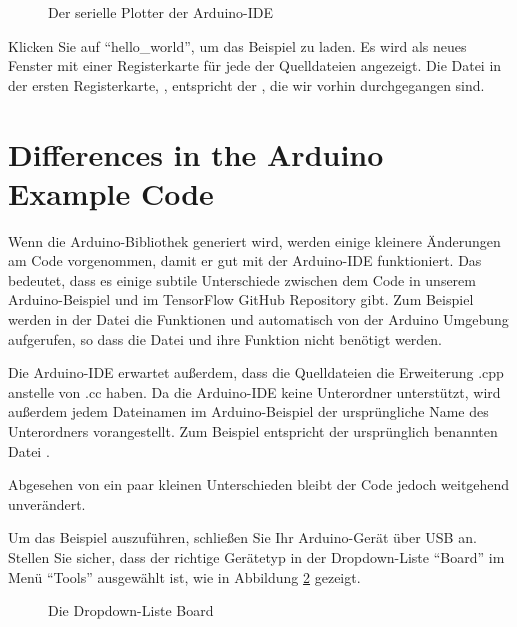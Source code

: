 \begin{figure}
    \centering
    
    \caption{Der serielle Plotter der Arduino-IDE}\label{fig:ArduIDE}
\end{figure}
 	
Klicken Sie auf ``hello\_world'', um das Beispiel zu laden. Es wird als neues Fenster mit einer Registerkarte für jede der Quelldateien angezeigt. Die Datei in der ersten Registerkarte, , entspricht der , die wir vorhin durchgegangen sind.
 
\section{Differences in the Arduino Example Code}
     
Wenn die Arduino-Bibliothek generiert wird, werden einige kleinere Änderungen am Code vorgenommen, damit er gut mit der Arduino-IDE funktioniert. Das bedeutet, dass es einige subtile Unterschiede zwischen dem Code in unserem Arduino-Beispiel und im TensorFlow GitHub Repository gibt. Zum Beispiel werden in der Datei  die Funktionen  und  automatisch von der Arduino Umgebung aufgerufen, so dass die Datei  und ihre Funktion  nicht benötigt werden.

Die Arduino-IDE erwartet außerdem, dass die Quelldateien die Erweiterung .cpp anstelle von .cc haben. Da die Arduino-IDE keine Unterordner unterstützt, wird außerdem jedem Dateinamen im Arduino-Beispiel der ursprüngliche Name des Unterordners vorangestellt. Zum Beispiel entspricht  der ursprünglich benannten Datei .

Abgesehen von ein paar kleinen Unterschieden bleibt der Code jedoch weitgehend unverändert.
 
Um das Beispiel auszuführen, schließen Sie Ihr Arduino-Gerät über USB an. Stellen Sie sicher, dass der richtige Gerätetyp in der Dropdown-Liste ``Board'' im Menü ``Tools'' ausgewählt ist, wie in Abbildung \ref{fig:ArduSelectBoard} gezeigt. 	
 	
\begin{figure}
    \centering
    
    \caption{Die Dropdown-Liste Board}\label{fig:ArduSelectBoard}
\end{figure}     
     

